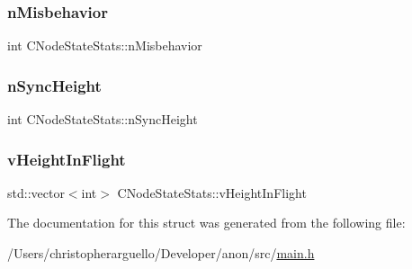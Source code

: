 \subsubsection{\texorpdfstring{n\+Misbehavior}{nMisbehavior}}
{\footnotesize\ttfamily int C\+Node\+State\+Stats\+::n\+Misbehavior}

\mbox{\label{struct_c_node_state_stats_a7646deac801098e973a5bc50202f92cd}} 
\subsubsection{\texorpdfstring{n\+Sync\+Height}{nSyncHeight}}
{\footnotesize\ttfamily int C\+Node\+State\+Stats\+::n\+Sync\+Height}

\mbox{\label{struct_c_node_state_stats_a4b03fd8ecaa9268f7eca836e5e79c35a}} 
\subsubsection{\texorpdfstring{v\+Height\+In\+Flight}{vHeightInFlight}}
{\footnotesize\ttfamily std\+::vector$<$int$>$ C\+Node\+State\+Stats\+::v\+Height\+In\+Flight}



The documentation for this struct was generated from the following file\+:\begin{DoxyCompactItemize}
\item 
/\+Users/christopherarguello/\+Developer/anon/src/\mbox{\hyperlink{main_8h}{main.\+h}}\end{DoxyCompactItemize}

